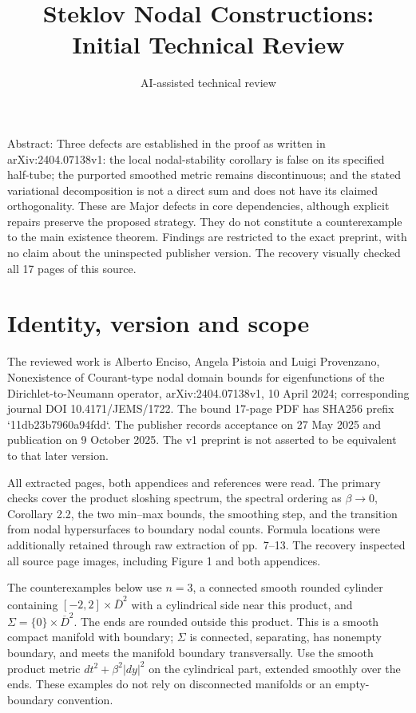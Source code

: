 \documentclass[10pt]{article}
\title{Steklov Nodal Constructions: Initial Technical Review}
\author{AI-assisted technical review}
\date{}
\begin{document}
\maketitle
Abstract: Three defects are established in the proof as written in arXiv:2404.07138v1: the local nodal-stability corollary is false on its specified half-tube; the purported smoothed metric remains discontinuous; and the stated variational decomposition is not a direct sum and does not have its claimed orthogonality. These are Major defects in core dependencies, although explicit repairs preserve the proposed strategy. They do not constitute a counterexample to the main existence theorem. Findings are restricted to the exact preprint, with no claim about the uninspected publisher version. The recovery visually checked all 17 pages of this source.\par
\section*{Identity, version and scope}
The reviewed work is Alberto Enciso, Angela Pistoia and Luigi Provenzano, Nonexistence of Courant-type nodal domain bounds for eigenfunctions of the Dirichlet-to-Neumann operator, arXiv:2404.07138v1, 10 April 2024; corresponding journal DOI 10.4171/JEMS/1722. The bound 17-page PDF has SHA256 prefix `11db23b7960a94fdd`. The publisher records acceptance on 27 May 2025 and publication on 9 October 2025. The v1 preprint is not asserted to be equivalent to that later version.\par
All extracted pages, both appendices and references were read. The primary checks cover the product sloshing spectrum, the spectral ordering as \(\beta\to0\), Corollary 2.2, the two min–max bounds, the smoothing step, and the transition from nodal hypersurfaces to boundary nodal counts. Formula locations were additionally retained through raw extraction of pp. 7–13. The recovery inspected all source page images, including Figure 1 and both appendices.\par
The counterexamples below use \(n=3\), a connected smooth rounded cylinder containing \([-2,2]\times\overline D^2\) with a cylindrical side near this product, and \(\Sigma=\{0\}\times\overline D^2\). The ends are rounded outside this product. This is a smooth compact manifold with boundary; \(\Sigma\) is connected, separating, has nonempty boundary, and meets the manifold boundary transversally. Use the smooth product metric \(dt^2+\beta^2|dy|^2\) on the cylindrical part, extended smoothly over the ends. These examples do not rely on disconnected manifolds or an empty-boundary convention.\par
\end{document}
